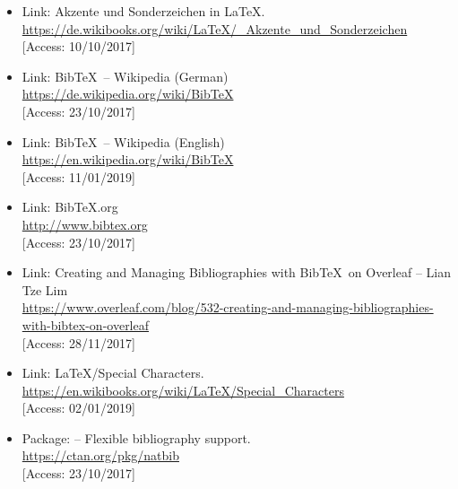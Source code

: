 \documentclass[a4paper,10pt,handout]{beamer}
\begin{document}
\begin{frame}[allowframebreaks]
{\begin{itemize}



		\item Link: Akzente und Sonderzeichen in \LaTeX .\\
		\url{https://de.wikibooks.org/wiki/LaTeX/_Akzente_und_Sonderzeichen}\\
		{[}Access: 10/10/2017]

		\item Link: Bib\TeX\ -- Wikipedia (German)\\
		\url{https://de.wikipedia.org/wiki/BibTeX}\\
		{[}Access: 23/10/2017]
		
		\item Link: Bib\TeX\ -- Wikipedia (English)\\
		\url{https://en.wikipedia.org/wiki/BibTeX}\\
		{[}Access: 11/01/2019]
		
		\item Link: Bib\TeX .org\\
		\url{http://www.bibtex.org}\\
		{[}Access: 23/10/2017]
		
		\item Link: Creating and Managing Bibliographies with Bib\TeX\ on Overleaf -- Lian Tze Lim\\
		\url{https://www.overleaf.com/blog/532-creating-and-managing-bibliographies-with-bibtex-on-overleaf}\\
		{[}Access: 28/11/2017]
		
		\item Link: \LaTeX /Special Characters.\\
		\url{https://en.wikibooks.org/wiki/LaTeX/Special_Characters}\\
		{[}Access: 02/01/2019]
		
		\item Package:  -- Flexible bibliography support.\\
		\url{https://ctan.org/pkg/natbib}\\
		{[}Access: 23/10/2017]


%


\end{itemize}}
\end{frame}
\end{document}
